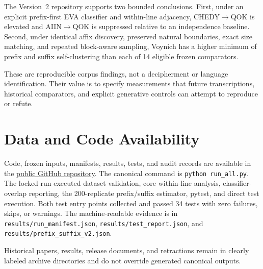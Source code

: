 \documentclass[11pt]{article}
\begin{document}
The Version~2 repository supports two bounded conclusions. First, under an
explicit prefix-first EVA classifier and within-line adjacency, CHEDY$\to$QOK
is elevated and AIIN$\to$QOK is suppressed relative to an independence
baseline. Second, under identical affix discovery, preserved natural
boundaries, exact size matching, and repeated block-aware sampling, Voynich
has a higher minimum of prefix and suffix self-clustering than each of 14
eligible frozen comparators.

These are reproducible corpus findings, not a decipherment or language
identification. Their value is to specify measurements that future
transcriptions, historical comparators, and explicit generative controls can
attempt to reproduce or refute.

\section{Data and Code Availability}

Code, frozen inputs, manifests, results, tests, and audit records are available
in the \href{https://github.com/amy2213/Voynich-Transition-Grammar}{public
GitHub repository}. The canonical command is
\texttt{python run\_all.py}. The locked run executed dataset validation, core
within-line analysis, classifier-overlap reporting, the 200-replicate
prefix/suffix estimator, pytest, and direct test execution. Both test entry
points collected and passed 34 tests with zero failures, skips, or warnings.
The machine-readable evidence is in \texttt{results/run\_manifest.json},
\texttt{results/test\_report.json}, and
\texttt{results/prefix\_suffix\_v2.json}.

Historical papers, results, release documents, and retractions remain in
clearly labeled archive directories and do not override generated canonical
outputs.



\end{document}
